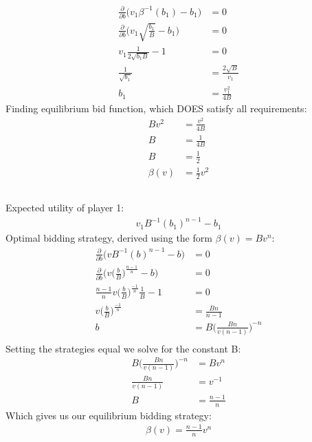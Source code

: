 \documentclass[a4paper,12pt]{article}
\begin{document}
\subsection{}
\begin{align*}
\frac{\partial}{\partial b} \bigg( v_1 \beta^{-1}(b_1) - b_1 \bigg) &= 0\\
\frac{\partial}{\partial b} \bigg( v_1 \sqrt{\frac{b_1}{B}} - b_1 \bigg) &= 0 \\
v_1 \frac{1}{2 \sqrt{b_1 B}} - 1 &= 0 \\
\frac{1}{\sqrt{b_1}} &= \frac{2 \sqrt{B}}{v_1} \\
b_1 &= \frac{v_1^2}{4B} 
\end{align*}
%
Finding equilibrium bid function, which DOES satisfy all requirements: 
%
\begin{align*}
Bv^2 &= \frac{v^2}{4B} \\
B &= \frac{1}{4B} \\
B &= \frac{1}{2} \\
\beta(v) &= \frac{1}{2}v^2
\end{align*}

\subsection{}
%
Expected utility of player 1: 
\begin{align*}
v_1B^{-1}(b_1)^{n - 1} - b_1
\end{align*}
%
Optimal bidding strategy, derived using the form $\beta(v) = Bv^n$: 
\begin{align*}
\frac{\partial}{\partial b} \bigg( vB^{-1}(b)^{n - 1} - b \bigg) &= 0 \\
\frac{\partial}{\partial b} \bigg( v\big( \frac{b}{B} \big)^{\frac{n - 1}{n}} - b \bigg) &= 0 \\
\frac{n-1}{n} v \big( \frac{b}{B} \big)^{\frac{-1}{n}}\frac{1}{B} - 1  &= 0 \\
v \big( \frac{b}{B} \big)^{\frac{-1}{n}}&= \frac{Bn}{n - 1} \\
b &= B\bigg( \frac{Bn}{v(n - 1)} \bigg)^{-n}\\
\end{align*}
%
Setting the strategies equal we solve for the constant B:
%
\begin{align*}
B\bigg( \frac{Bn}{v(n - 1)} \bigg)^{-n} &= Bv^n \\
\frac{Bn}{v(n - 1)} &= v^{-1} \\
B &= \frac{n-1}{n}
\end{align*}
Which gives us our equilibrium bidding strategy: 
%
\begin{align*}
\beta(v) = \frac{n-1}{n}v^n
\end{align*}
\end{document}
